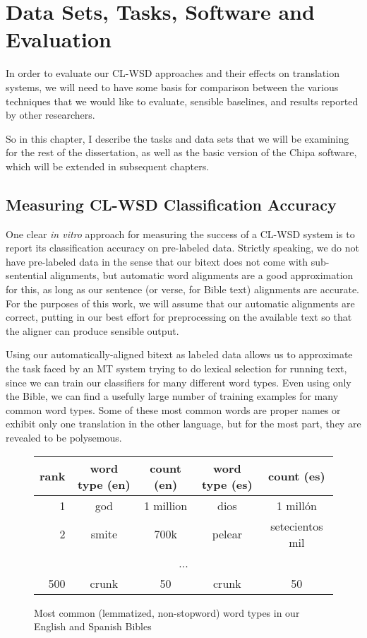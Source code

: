 \chapter{Data Sets, Tasks, Software and Evaluation}
\label{chap:evaluation}
In order to evaluate our CL-WSD approaches and their effects on translation
systems, we will need to have some basis for comparison between the various
techniques that we would like to evaluate, sensible baselines, and results
reported by other researchers.

So in this chapter, I describe the tasks and data sets that we will be
examining for the rest of the dissertation, as well as the basic version of the
Chipa software, which will be extended in subsequent chapters.

\section{Measuring CL-WSD Classification Accuracy}
One clear \emph{in vitro} approach for measuring the success of a CL-WSD system
is to report its classification accuracy on pre-labeled data.  Strictly
speaking, we do not have pre-labeled data in the sense that our bitext does not
come with sub-sentential alignments, but automatic word alignments are a good
approximation for this, as long as our sentence (or verse, for Bible text)
alignments are accurate. For the purposes of this work, we will assume that our
automatic alignments are correct, putting in our best effort for preprocessing
on the available text so that the aligner can produce sensible output.

Using our automatically-aligned bitext as labeled data allows us to approximate
the task faced by an MT system trying to do lexical selection for running text,
since we can train our classifiers for many different word types. Even using
only the Bible, we can find a usefully large number of training examples for
many common word types. Some of these most common words are proper names or
exhibit only one translation in the other language, but for the most part, they
are revealed to be polysemous.

\begin{figure*}
  \begin{centering}
  \begin{tabular}{|r|c|c|c|c|}
    \hline
    rank & word type (en) & count (en) & word type (es) & count (es) \\
    \hline
    1    & god       & 1 million & dios   & 1 millón \\
    2    & smite     & 700k      & pelear & setecientos mil \\
    \multicolumn{5}{|c|}{...} \\ 
    500 & crunk      & 50 & crunk  & 50 \\
    \hline
  \end{tabular}
  \end{centering}
  \caption{Most common (lemmatized, non-stopword) word types in our English and
  Spanish Bibles}
  \label{fig:mostcommon-en-es}
\end{figure*}


